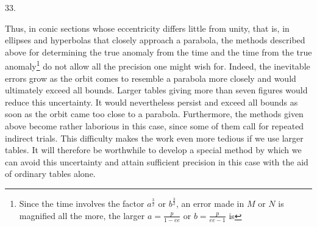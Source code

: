 \par{}
\begin{center}
\hypertarget{native-051-article033}{}33.
\end{center}
Thus, in conic sections whose eccentricity differs little from unity, that is, in ellipses and hyperbolas that closely approach a parabola, the methods described above for determining the true anomaly from the time and the time from the true anomaly\footnote{Since the time involves the factor $a^{\frac{3}{2}}$ or $b^{\frac{3}{2}}$, an error made in $M$ or $N$ is magnified all the more, the larger $a=\frac{p}{1-ee}$ or $b=\frac{p}{ee-1}$ is} do not allow all the precision one might wish for. Indeed, the inevitable errors grow as the orbit comes to resemble a parabola more closely and would ultimately exceed all bounds. Larger tables giving more than seven figures would reduce this uncertainty. It would nevertheless persist and exceed all bounds as soon as the orbit came too close to a parabola. Furthermore, the methods given above become rather laborious in this case, since some of them call for repeated indirect trials. This difficulty makes the work even more tedious if we use larger tables. It will therefore be worthwhile to develop a special method by which we can avoid this uncertainty and attain sufficient precision in this case with the aid of ordinary tables alone.

